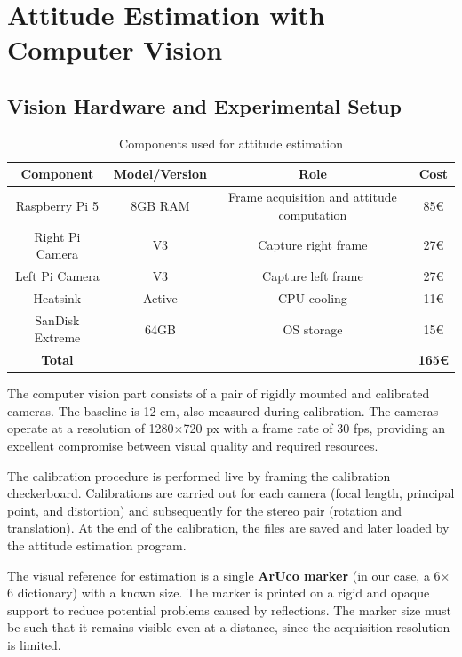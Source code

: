 \chapter[Attitude Estimation with CV]{Attitude Estimation with Computer Vision}
\thispagestyle{empty}
\section{Vision Hardware and Experimental Setup}
\begin{table}[h]
    \centering
    \begin{tabular}{|c|c|c|c|}
        \hline
        \textbf{Component} & \textbf{Model/Version} & \textbf{Role} & \textbf{Cost} \\
        \hline
        Raspberry Pi 5 & 8GB RAM & Frame acquisition and attitude computation & 85€ \\
        \hline
        Right Pi Camera & V3 & Capture right frame & 27€ \\
        \hline
        Left Pi Camera & V3 & Capture left frame & 27€ \\
        \hline
        Heatsink & Active & CPU cooling & 11€ \\
        \hline
        SanDisk Extreme & 64GB & OS storage & 15€ \\
        \hline
        \textbf{Total} & & & \textbf{165€} \\
        \hline
    \end{tabular}
    \caption{Components used for attitude estimation}
    \label{tab:example}
\end{table}

The computer vision part consists of a pair of rigidly mounted and calibrated cameras. The baseline is 12 cm, also measured during calibration. The cameras operate at a resolution of 1280$\times$720 px with a frame rate of 30 fps, providing an excellent compromise between visual quality and required resources.

The calibration procedure is performed live by framing the calibration checkerboard. Calibrations are carried out for each camera (focal length, principal point, and distortion) and subsequently for the stereo pair (rotation and translation). At the end of the calibration, the files are saved and later loaded by the attitude estimation program.

The visual reference for estimation is a single \textbf{ArUco marker} (in our case, a 6$\times$6 dictionary) with a known size. The marker is printed on a rigid and opaque support to reduce potential problems caused by reflections. The marker size must be such that it remains visible even at a distance, since the acquisition resolution is limited.

